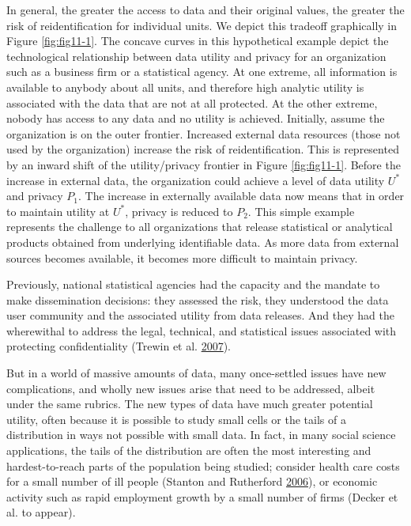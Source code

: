\documentclass[]{krantz}
\begin{document}
In general, the greater the access to data and their original values,
the greater the risk of reidentification for individual units. We depict
this tradeoff graphically in Figure \ref{fig:fig11-1}. The concave
curves in this hypothetical example depict the technological
relationship between data utility and privacy for an organization such
as a business firm or a statistical agency. At one extreme, all
information is available to anybody about all units, and therefore high
analytic utility is associated with the data that are not at all
protected. At the other extreme, nobody has access to any data and no
utility is achieved. Initially, assume the organization is on the outer
frontier. Increased external data resources (those not used by the
organization) increase the risk of reidentification. This is represented
by an inward shift of the utility/privacy frontier in Figure
\ref{fig:fig11-1}. Before the increase in external data, the
organization could achieve a level of data utility \(U^*\) and privacy
\(P_1\). The increase in externally available data now means that in
order to maintain utility at \(U^*\), privacy is reduced to \(P_2\).
This simple example represents the challenge to all organizations that
release statistical or analytical products obtained from underlying
identifiable data. As more data from external sources becomes available,
it becomes more difficult to maintain privacy.

Previously, national statistical agencies had the capacity and the
mandate to make dissemination decisions: they assessed the risk, they
understood the data user community and the associated utility from data
releases. And they had the wherewithal to address the legal, technical,
and statistical issues associated with protecting confidentiality
(Trewin et al. \protect\hyperlink{ref-trewin2007managing}{2007}).

But in a world of massive amounts of data, many once-settled issues have
new complications, and wholly new issues arise that need to be
addressed, albeit under the same rubrics. The new types of data have
much greater potential utility, often because it is possible to study
small cells or the tails of a distribution in ways not possible with
small data. In fact, in many social science applications, the tails of
the distribution are often the most interesting and hardest-to-reach
parts of the population being studied; consider health care costs for a
small number of ill people (Stanton and Rutherford
\protect\hyperlink{ref-stanton2006high}{2006}), or economic activity
such as rapid employment growth by a small number of firms (Decker et
al. to appear).
\end{document}
